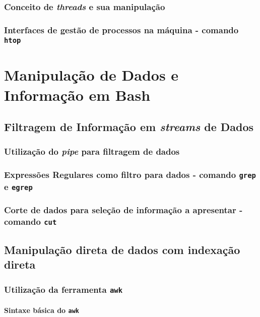 \documentclass[a4paper, onecolumn, 10pt]{report}
\begin{document}
\subsection{Conceito de \textit{threads} e sua manipulação}

\subsection{Interfaces de gestão de processos na máquina - comando \texttt{htop}}

\chapter{Manipulação de Dados e Informação em Bash}

\section{Filtragem de Informação em \textit{streams} de Dados}

\subsection{Utilização do \textit{pipe} para filtragem de dados}

\subsection{Expressões Regulares como filtro para dados - comando \texttt{grep} e \texttt{egrep}}

\subsection{Corte de dados para seleção de informação a apresentar - comando \texttt{cut}}

\section{Manipulação direta de dados com indexação direta}

\subsection{Utilização da ferramenta \texttt{awk}}

\subsubsection{Sintaxe básica do \texttt{awk}}
\end{document}
